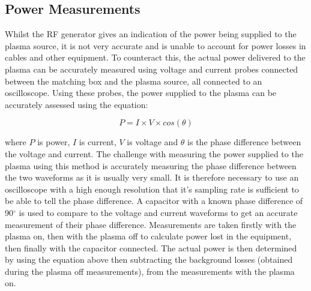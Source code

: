 \documentclass[11pt, oneside]{article}   	%
\begin{document}
\subsection{Power Measurements}

Whilst the RF generator gives an indication of the power being supplied to the plasma source, it is not very accurate and is unable to account for power losses in cables and other equipment.
To counteract this, the actual power delivered to the plasma can be accurately measured using voltage and current probes connected between the matching box and the plasma source, all connected to an oscilloscope. 
Using these probes, the power supplied to the plasma can be accurately assessed using the equation:

\begin{equation}
P = I \times V \times cos(\theta)
\end{equation}

where $P$ is power, $I$ is current, $V$ is voltage and $\theta$ is the phase difference between the voltage and current.
The challenge with measuring the power supplied to the plasma using this method is accurately measuring the phase difference between the two waveforms as it is usually very small.
It is therefore necessary to use an oscilloscope with a high enough resolution that it's sampling rate is sufficient to be able to tell the phase difference.
A capacitor with a known phase difference of 90$^{\circ}$ is used to compare to the voltage and current waveforms to get an accurate measurement of their phase difference.
Measurements are taken firstly with the plasma on, then with the plasma off to calculate power lost in the equipment, then finally with the capacitor connected.
The actual power is then determined by using the equation above then subtracting the background losses (obtained during the plasma off measurements), from the measurements with the plasma on.


\end{document}
